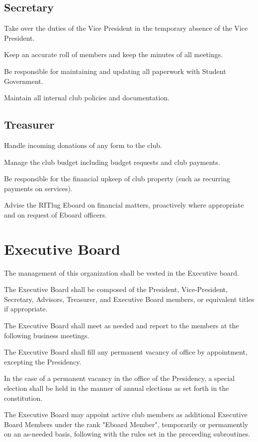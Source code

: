 \subsection{Secretary}
\begin{subroutines}
	\item Take over the duties of the Vice President in the temporary absence of the Vice President.
	\item Keep an accurate roll of members and keep the minutes of all meetings.
	\item Be responsible for maintaining and updating all paperwork with Student Government.
	\item Maintain all internal club policies and documentation.
\end{subroutines}
\subsection{Treasurer}
\begin{subroutines}
        \item Handle incoming donations of any form to the club.
        \item Manage the club budget including budget requests and club payments.
        \item Be responsible for the financial upkeep of club property (such as recurring payments on services).
        \item Advise the RITlug Eboard on financial matters, proactively where appropriate and on request of Eboard officers.
\end{subroutines}

\section{Executive Board}
\begin{subroutines}
\item The management of this organization shall be vested in the Executive board.
\item The Executive Board shall be composed of the President, Vice-President, Secretary, Advisors, Treasurer, and Executive Board members, or equivalent titles if appropriate.
\item The Executive Board shall meet as needed and report to the members at the following business meetings.
\item The Executive Board shall fill any permanent vacancy of office by appointment, excepting the Presidency.
\item In the case of a permanent vacancy in the office of the Presidency, a special election shall be held in the manner of annual elections as set forth in the constitution.
\item The Executive Board may appoint active club members as additional Executive Board Members under the rank "Eboard Member", temporarily or permamently on an as-needed basis, following with the rules set in the preceeding subroutines.
\end{subroutines}

